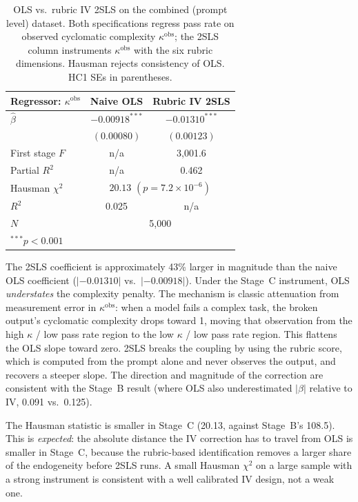 \documentclass[conference]{IEEEtran}
\begin{document}
\begin{table}[h]
\centering
\caption{OLS vs.\ rubric IV 2SLS on the combined (prompt level) dataset. Both specifications regress pass rate on observed cyclomatic complexity $\kappa^{\text{obs}}$; the 2SLS column instruments $\kappa^{\text{obs}}$ with the six rubric dimensions. Hausman rejects consistency of OLS. HC1 SEs in parentheses.}
\label{tab:ols-vs-2sls}
\begin{tabular}{@{}lcc@{}}
\toprule
Regressor: $\kappa^{\text{obs}}$ & Naive OLS & Rubric IV 2SLS \\
\midrule
$\hat{\beta}$               & $-0.00918^{***}$ & $-0.01310^{***}$ \\
                            & $(0.00080)$      & $(0.00123)$ \\
\midrule
First stage $F$             & n/a              & 3{,}001.6 \\
Partial $R^2$               & n/a              & 0.462 \\
Hausman $\chi^2$            & \multicolumn{2}{c}{$20.13$ $(p=7.2\times 10^{-6})$} \\
$R^2$                       & 0.025            & n/a \\
$N$                         & \multicolumn{2}{c}{5{,}000} \\
\bottomrule
\multicolumn{3}{l}{\footnotesize $^{***}p<0.001$}
\end{tabular}
\end{table}

The 2SLS coefficient is approximately 43\% larger in magnitude than the naive OLS coefficient ($|-0.01310|$ vs.\ $|-0.00918|$). Under the Stage~C instrument, OLS \emph{understates} the complexity penalty. The mechanism is classic attenuation from measurement error in $\kappa^{\text{obs}}$: when a model fails a complex task, the broken output's cyclomatic complexity drops toward 1, moving that observation from the high $\kappa$ / low pass rate region to the low $\kappa$ / low pass rate region. This flattens the OLS slope toward zero. 2SLS breaks the coupling by using the rubric score, which is computed from the prompt alone and never observes the output, and recovers a steeper slope. The direction and magnitude of the correction are consistent with the Stage~B result (where OLS also underestimated $|\beta|$ relative to IV, 0.091 vs.\ 0.125).

The Hausman statistic is smaller in Stage~C (20.13, against Stage~B's 108.5). This is \emph{expected}: the absolute distance the IV correction has to travel from OLS is smaller in Stage~C, because the rubric-based identification removes a larger share of the endogeneity before 2SLS runs. A small Hausman $\chi^2$ on a large sample with a strong instrument is consistent with a well calibrated IV design, not a weak one.
\end{document}
